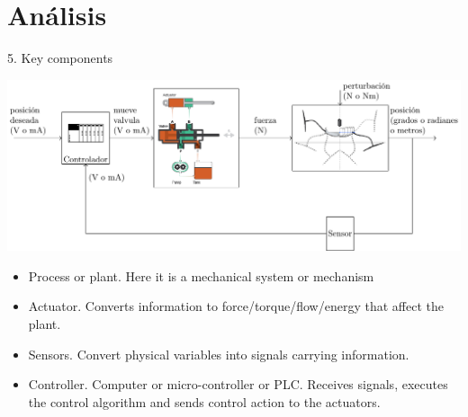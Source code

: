 \documentclass[presentation,aspectratio=169]{beamer}
\begin{document}
\section{Análisis}
\label{sec:org96aa2d0}

\begin{frame}[label={sec:orgc8fe4cc}]{5. Key components}
\begin{center}
\includegraphics[width=.8\textwidth]{../../figures/ac75-control-block-feedback-units}
\end{center}

\begin{itemize}
\item \alert{Process} or \alert{plant.}  Here it is a \alert{mechanical system} or \alert{mechanism}
\end{itemize}
\pause
\begin{itemize}
\item \alert{Actuator.} Converts information to force/torque/flow/energy that affect the plant.
\end{itemize}
\pause
\begin{itemize}
\item \alert{Sensors.}  Convert physical variables into signals carrying information.
\end{itemize}
\pause
\begin{itemize}
\item \alert{Controller.} Computer or micro-controller or PLC. Receives signals, executes the control algorithm and sends control action to the actuators.
\end{itemize}
\end{frame}
\end{document}

